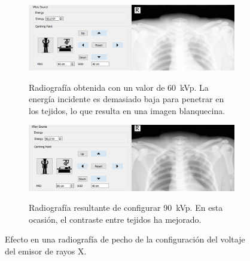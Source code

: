 \begin{figure}[h]
    \begin{subfigure}[b]{0.9\linewidth}
        \centering
        {\includegraphics[width=\linewidth]{IMG/60kvp.png}}
        \caption{Radiografía obtenida con un valor de 60~\ac{kVp}.  La energía incidente es demasiado baja para penetrar en los tejidos, lo que resulta en una imagen blanquecina.\label{fig:60kvp}}
    \end{subfigure}
    
     \begin{subfigure}[b]{0.9\linewidth}
        \centering
        {\includegraphics[width=\linewidth]{IMG/90kvp.png}}
        \caption{ Radiografía resultante de configurar 90~\ac{kVp}. En esta ocasión, el contraste entre tejidos ha mejorado.\label{fig:90kvp}}
    \end{subfigure}
    \caption{Efecto en una radiografía de pecho de la configuración del voltaje del emisor de rayos X. \label{fig:setup}}
   \end{figure}
   


  
